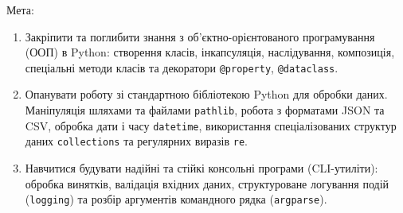 \documentclass[12pt, a4paper]{article}
\begin{document}

Мета:
\begin{enumerate}
	\item Закріпити та поглибити знання з об'єктно-орієнтованого програмування (ООП) в Python: створення класів, інкапсуляція, наслідування, композиція, спеціальні методи класів та декоратори \verb|@property|, \verb|@dataclass|.
	\item Опанувати роботу зі стандартною бібліотекою Python для обробки даних. Маніпуляція шляхами та файлами \verb|pathlib|, робота з форматами JSON та CSV, обробка дати і часу \verb|datetime|, використання спеціалізованих структур даних \verb|collections| та регулярних виразів \verb|re|.
	\item Навчитися будувати надійні та стійкі консольні програми (CLI-утиліти): обробка винятків, валідація вхідних даних, структуроване логування подій (\verb|logging|) та розбір аргументів командного рядка (\verb|argparse|).
\end{enumerate}
\end{document}
